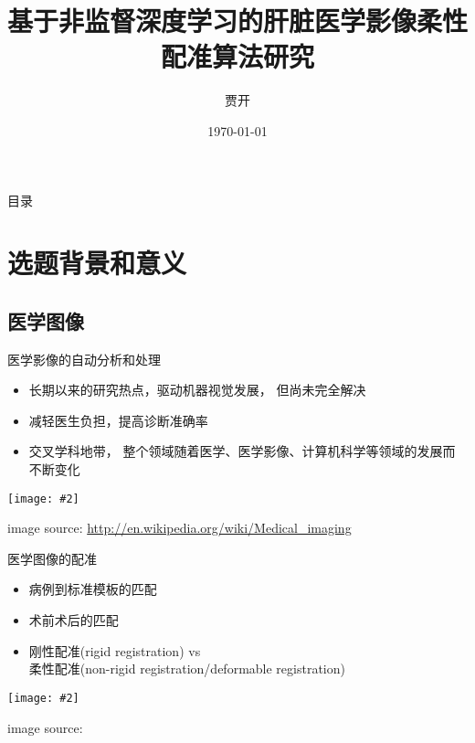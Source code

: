 \documentclass {beamer}
\title{基于非监督深度学习的肝脏医学影像柔性配准算法研究}
\author {贾开}
\institute {清华大学}
\date{\today}
\newcommand{\addgraph}[2]{\begin{center}
\texttt{[image: \#2]}\end{center}}
\begin{document}



\begin{frame}{目录}
    \tableofcontents
\end{frame}

\section{选题背景和意义}

\subsection{医学图像}

\begin{frame}{医学影像的自动分析和处理}
    \begin{itemize}
        \item 长期以来的研究热点，驱动机器视觉发展，
            但尚未完全解决
        \item 减轻医生负担，提高诊断准确率
        \item 交叉学科地带，
            整个领域随着医学、医学影像、计算机科学等领域的发展而不断变化
    \end{itemize}
    \addgraph{0.3}{res/mi-concept.jpg}
    \tiny{image source:
        \url{http://en.wikipedia.org/wiki/Medical\_imaging}}
\end{frame}


\begin{frame}{医学图像的配准}
    \begin{itemize}
        \item 病例到标准模板的匹配
        \item 术前术后的匹配
        \item 刚性配准(rigid registration) vs \\
            柔性配准(non-rigid
            registration/deformable registration)
    \end{itemize}
    \addgraph{0.5}{res/example-brain.png}
    \tiny{image source: \cite{shen2007image}}
\end{frame}
\end{document}
